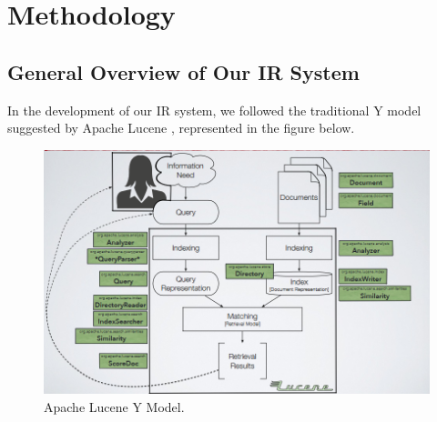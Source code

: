 \section{Methodology}
\label{sec:methodology}

\subsection{General Overview of Our IR System}
In the development of our \ac{IR} system, we followed the traditional Y model suggested by Apache Lucene \cite{lucene}, represented in the figure below.

\begin{figure}[!h]
    \centering
    \includegraphics[width=0.8\linewidth]{figure/lucene_yModel.png}
    \caption{Apache Lucene Y Model.}
    \label{fig:lucene_yModel}
\end{figure}

